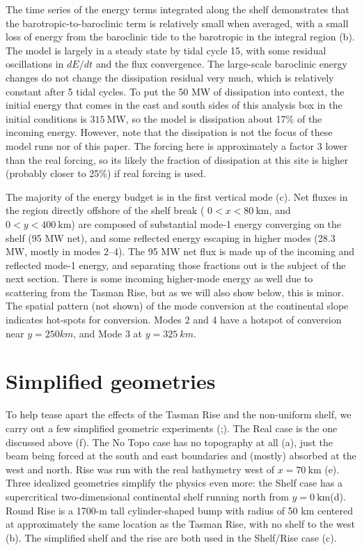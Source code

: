 \documentclass[10pt]{article}
\newcommand{\mn}[1]{{\sc #1}}
\begin{document}
The time series of the energy terms integrated along the shelf demonstrates that the barotropic-to-baroclinic term is relatively small when averaged, with a small loss of energy from the baroclinic tide to the barotropic in the integral region (b).  The model is largely in a steady state by tidal cycle 15, with some residual oscillations in $dE/dt$ and the flux convergence.  The large-scale baroclinic energy changes do not change the dissipation residual very much, which is relatively constant after 5 tidal cycles.  To put the 50 MW of dissipation into context, the initial energy that comes in the east and south sides of this analysis box in the initial conditions is $315\ \mathrm{MW}$, so the model is dissipation about 17\% of the incoming energy.  However, note that the dissipation is not the focus of these model runs nor of this paper. The forcing here is approximately a factor 3 lower than the real forcing, so its likely the fraction of dissipation at this site is higher (probably closer to 25\%) if real forcing is used.  

The majority of the energy budget is in the first vertical mode (c).  Net fluxes in the region directly offshore of the shelf break ( $0<x<80\ \mathrm{km}$, and $0<y<400\ \mathrm{km}$) are composed of substantial mode-1 energy converging on the shelf (95 MW net), and some reflected energy escaping in higher modes (28.3 MW, mostly in modes 2--4).  The 95 MW net flux is made up of the incoming and reflected mode-1 energy, and separating those fractions out is the subject of the next section.  There is some incoming higher-mode energy as well due to scattering from the Tasman Rise, but as we will also show below, this is minor.  The spatial pattern (not shown) of the mode conversion at the continental slope indicates hot-spots for conversion.  Modes 2 and 4 have a hotspot of conversion near $y=250 km$, and Mode 3 at $y=325\ km$.  

\section{Simplified geometries}
\label{sec:Simplified}

To help tease apart the effects of the Tasman Rise and the non-uniform shelf, we carry out a few simplified geometric experiments (;).  The \mn{Real} case is the one discussed above (f).  The \mn{No Topo} case has no topography at all (a), just the beam being forced at the south and east boundaries and (mostly) absorbed at the west and north. \mn{Rise} was run with the real bathymetry west of $x=70\ \mathrm{km}$ (e).  Three idealized geometries simplify the physics even more: the \mn{Shelf} case has a supercritical two-dimensional continental shelf running north from $y=0\ \mathrm{km}$(d).  \mn{Round Rise} is a 1700-m tall cylinder-shaped bump with radius of 50 km centered at approximately the same location as the Tasman Rise, with no shelf to the west (b).  The simplified shelf and the rise are both used in the \mn{Shelf/Rise} case (c).  
\end{document}
